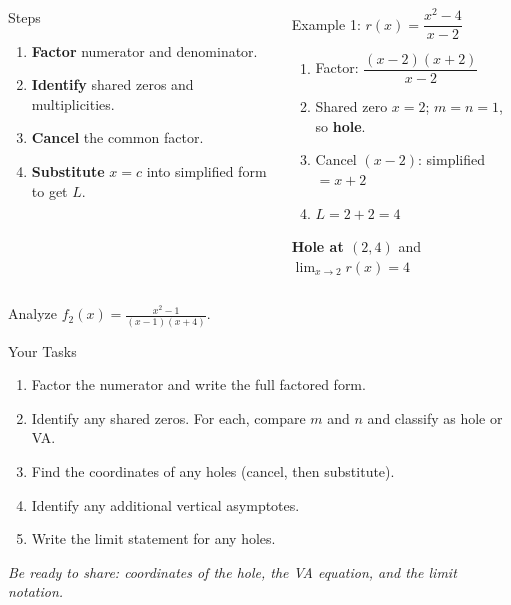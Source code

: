 \documentclass[aspectratio=169, 11pt]{beamer}
\begin{document}
\begin{frame}[t, plain]

  \begin{columns}[T]
      \begin{block}{Steps}
        \begin{enumerate}\setlength{\itemsep}{4pt}
          \item \textbf{Factor} numerator and denominator.
          \item \textbf{Identify} shared zeros and multiplicities.
          \item \textbf{Cancel} the common factor.
          \item \textbf{Substitute} $x = c$ into simplified form to get $L$.
        \end{enumerate}
      \end{block}

      \begin{block}{Example 1: $r(x) = \dfrac{x^2 - 4}{x - 2}$}
        \begin{enumerate}\setlength{\itemsep}{3pt}
          \item Factor: $\dfrac{(x-2)(x+2)}{x-2}$
          \item Shared zero $x=2$; $m = n = 1$, so \textbf{hole}.
          \item Cancel $(x-2)$: simplified $= x+2$
          \item $L = 2 + 2 = 4$
        \end{enumerate}
        \medskip
        \textbf{Hole at $(2, 4)$} \quad and \quad $\displaystyle\lim_{x \to 2} r(x) = 4$
      \end{block}
  \end{columns}
\end{frame}

\begin{frame}[t, plain]

  Analyze $\displaystyle f_2(x) = \frac{x^2 - 1}{(x-1)(x+4)}$.

  \bigskip
  \begin{block}{Your Tasks}
    \begin{enumerate}\setlength{\itemsep}{6pt}
      \item Factor the numerator and write the full factored form.
      \item Identify any shared zeros. For each, compare $m$ and $n$ and classify as hole or VA.
      \item Find the coordinates of any holes (cancel, then substitute).
      \item Identify any additional vertical asymptotes.
      \item Write the limit statement for any holes.
    \end{enumerate}
  \end{block}

  \bigskip
  \textit{Be ready to share: coordinates of the hole, the VA equation, and the limit notation.}
\end{frame}
\end{document}
